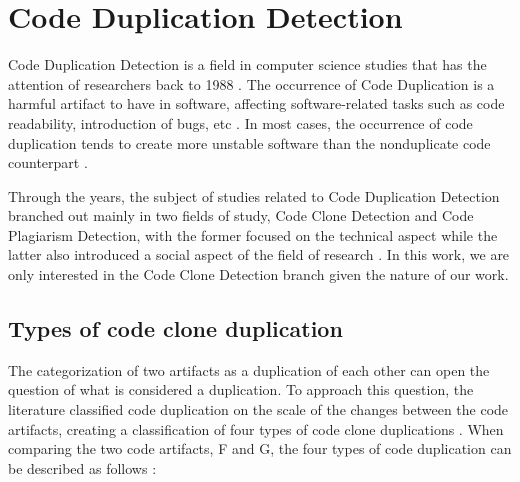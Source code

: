 \en

\section{Code Duplication Detection}

Code Duplication Detection is a field in computer science studies that has the attention of researchers 
back to 1988 \citep{firstman}.
The occurrence of Code Duplication is a harmful artifact to have in software, affecting software-related 
tasks such as code readability, introduction of bugs, etc \citep{harmone}. 
In most cases, the occurrence of code duplication tends to create more unstable software 
than the nonduplicate code counterpart \citep{harmtwo} .

Through the years, the subject of studies related to Code Duplication Detection branched out mainly in 
two fields of study, Code Clone Detection and Code Plagiarism Detection, with the former focused on the 
technical aspect while the latter also introduced a social aspect of the field of research
\citep{litreview}. 
In this work, we are only interested in the Code Clone Detection branch given the nature of our work.

\subsection{Types of code clone duplication}

\label{subsec:types}

The categorization of two artifacts as a duplication of each other can open the question of what is considered 
a duplication. To approach this question, the literature classified code duplication on the scale of the 
changes between the code artifacts, creating a classification of four types of code clone 
duplications \citep{litreview}. 
When comparing the two code artifacts, F and G, the four types of code duplication can be described 
as follows \citep{litreview}:

